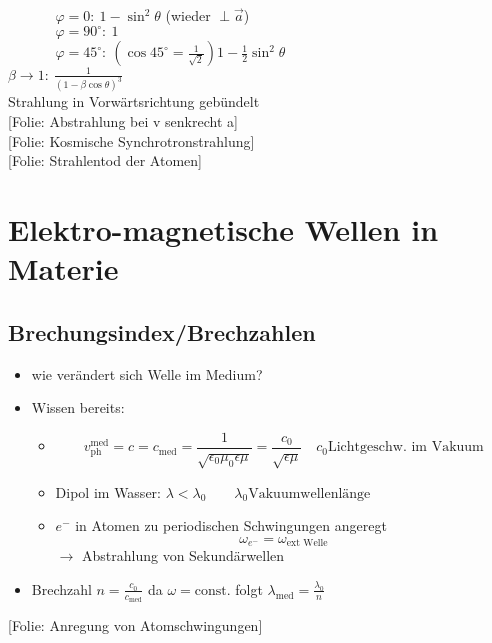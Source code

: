 \documentclass[titlepage,12pt,a4paper,ngerman]{report}
\newcommand{\tx}[1]{\textrm{#1}}
\newcommand{\folie}[1]{\color{gray}[Folie: #1]\color{black}}
\newcommand{\const}{\tx{const.}}
\begin{document}
\begin{enumerate}[i)]
\begin{itemize}
		$\phantom{\qquad \quad \ \, }  \varphi = 0 :  \ 1 - \sin ^2 \theta  $ (wieder $ \perp \vec{a} $)\\
		$\phantom{\qquad \quad \ \, } \varphi = 90^\circ : \ 1 $\\
		$\phantom{\qquad \quad \ \, } \varphi = 45^\circ : \ (\cos 45^\circ = \frac{1}{\sqrt{2}} )  1 - \frac{1}{2} \sin^2 \theta $\\
		$ \beta \rightarrow 1 : \ \frac{1}{(1 - \beta \cos \theta)^3} $\\[5pt]
		\phantom{\qquad \quad \, } Strahlung in Vorwärtsrichtung gebündelt\\
		\phantom{\qquad \quad \, } \folie{Abstrahlung bei v senkrecht a} \\ \phantom{\qquad \quad \, } \folie{Kosmische Synchrotronstrahlung} \\
		\phantom{\qquad \quad \, } \folie{Strahlentod der Atomen}
	\end{itemize}
\end{enumerate}


\section{Elektro-magnetische Wellen in Materie}
\subsection{Brechungsindex/Brechzahlen}
\begin{itemize}
	\item wie verändert sich Welle im Medium?
	\item Wissen bereits:
	\begin{itemize}
		\item 	$$v_{\tx{ph}}^{\tx{med}} = c = c_{\tx{med}} = \frac{1}{\sqrt{\epsilon_0 \mu_0 \epsilon \mu}} = \frac{c_0}{\sqrt{\epsilon \mu}} \quad c_0 \tx{Lichtgeschw. im Vakuum}$$
		\item Dipol im Wasser: $ \lambda < \lambda_0 \qquad \lambda_0 \tx{Vakuumwellenlänge}$
		\item $ e^- $ in Atomen zu periodischen Schwingungen angeregt
		$$\omega_{e^-} = \omega_{\tx{ext Welle}}$$
		$ \rightarrow $ Abstrahlung von Sekundärwellen
	\end{itemize}
	\item Brechzahl $ n = \frac{c_0}{c_{\tx{med}}} $ da $ \omega = \const $ folgt $ \lambda_{\tx{med}} = \frac{\lambda_0}{n} $
\end{itemize}
\folie{Anregung von Atomschwingungen}
\end{document}
